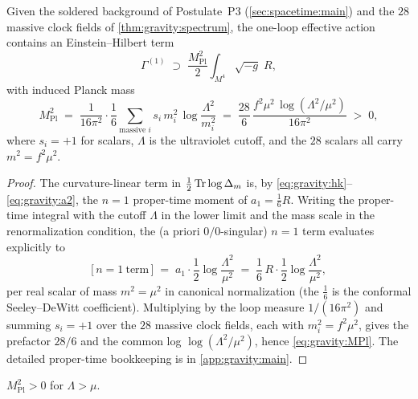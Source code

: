 \begin{theorem}
\label{thm:gravity:planck}
\label{thm:gravity:MPl}
\label{thm:GravitySummary}
Given the soldered background of Postulate~P3 (\autoref{sec:spacetime:main})
and the $28$ massive clock fields of \autoref{thm:gravity:spectrum}, the
one-loop effective action contains an Einstein--Hilbert term
\begin{equation}\label{eq:gravity:EH}
  \Gamma^{(1)} \;\supset\;
  \frac{M_{\mathrm{Pl}}^{2}}{2}\int_{M^{4}}\!\sqrt{-g}\;R,
\end{equation}
with induced Planck mass
\begin{equation}\label{eq:gravity:MPl}
  M_{\mathrm{Pl}}^{2}
  \;=\;
  \frac{1}{16\pi^{2}}\cdot\frac{1}{6}
  \sum_{\text{massive } i} s_{i}\, m_{i}^{2}\,\log\frac{\Lambda^{2}}{m_{i}^{2}}
  \;=\;
  \frac{28}{6}\,
  \frac{f^{2}\mu^{2}\,\log(\Lambda^{2}/\mu^{2})}{16\pi^{2}}
  \;>\; 0 ,
\end{equation}
where $s_{i}=+1$ for scalars, $\Lambda$ is the ultraviolet cutoff, and the
$28$ scalars all carry $m^{2}=f^{2}\mu^{2}$.
\end{theorem}

\begin{proof}
The curvature-linear term in $\tfrac12\operatorname{Tr}\log\Delta_{m}$ is, by
\eqref{eq:gravity:hk}--\eqref{eq:gravity:a2}, the $n=1$ proper-time moment
of $a_{1}=\tfrac16 R$. Writing the proper-time integral with the cutoff
$\Lambda$ in the lower limit and the mass scale in the renormalization
condition, the (a priori $0/0$-singular) $n=1$ term evaluates explicitly to
\begin{equation}\label{eq:gravity:n1}
  \bigl[\,n=1\ \text{term}\,\bigr]
  \;=\;
  a_{1}\cdot\frac12\log\frac{\Lambda^{2}}{\mu^{2}}
  \;=\;
  \frac{1}{6}\,R\cdot\frac12\log\frac{\Lambda^{2}}{\mu^{2}},
\end{equation}
per real scalar of mass $m^{2}=\mu^{2}$ in canonical normalization (the
$\tfrac16$ is the conformal Seeley--DeWitt coefficient). Multiplying by the
loop measure $1/(16\pi^{2})$ and summing $s_{i}=+1$ over the $28$ massive
clock fields, each with $m_{i}^{2}=f^{2}\mu^{2}$, gives the prefactor
$28/6$ and the common log $\log(\Lambda^{2}/\mu^{2})$, hence
\eqref{eq:gravity:MPl}. The detailed proper-time bookkeeping is in
\autoref{app:gravity:main}.
\end{proof}

\begin{proposition}
\label{prop:gravity:positivity}
$M_{\mathrm{Pl}}^{2}>0$ for $\Lambda>\mu$.
\end{proposition}

